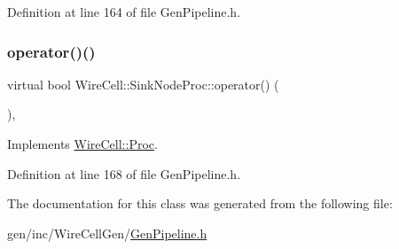 Definition at line 164 of file Gen\+Pipeline.\+h.

\mbox{\label{class_wire_cell_1_1_sink_node_proc_a4bc788f3ec9f7558438f8b5f61a5ca1f}} 
\subsubsection{\texorpdfstring{operator()()}{operator()()}}
{\footnotesize\ttfamily virtual bool Wire\+Cell\+::\+Sink\+Node\+Proc\+::operator() (\begin{DoxyParamCaption}{ }\end{DoxyParamCaption})\hspace{0.3cm}{\ttfamily [inline]}, {\ttfamily [virtual]}}



Implements \hyperlink{class_wire_cell_1_1_proc_a9c642ed1f6b6741633c6cb1bd063b502}{Wire\+Cell\+::\+Proc}.



Definition at line 168 of file Gen\+Pipeline.\+h.



The documentation for this class was generated from the following file\+:\begin{DoxyCompactItemize}
\item 
gen/inc/\+Wire\+Cell\+Gen/\hyperlink{_gen_pipeline_8h}{Gen\+Pipeline.\+h}\end{DoxyCompactItemize}
